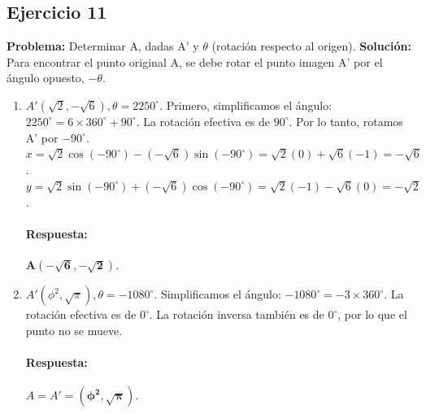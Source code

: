 \documentclass[12pt, letterpaper]{article}
\begin{document}
\subsection{Ejercicio 11}
\textbf{Problema:} Determinar A, dadas A' y $\theta$ (rotación respecto al origen).
\textbf{Solución:} Para encontrar el punto original A, se debe rotar el punto imagen A' por el ángulo opuesto, $-\theta$.
\begin{enumerate}[label=\alph*)]
    \item $A'(\sqrt{2},-\sqrt{6}), \theta=2250^\circ$. Primero, simplificamos el ángulo: $2250^\circ = 6 \times 360^\circ + 90^\circ$. La rotación efectiva es de $90^\circ$. Por lo tanto, rotamos A' por $-90^\circ$.
    $x = \sqrt{2}\cos(-90^\circ) - (-\sqrt{6})\sin(-90^\circ) = \sqrt{2}(0) + \sqrt{6}(-1) = -\sqrt{6}$.
    $y = \sqrt{2}\sin(-90^\circ) + (-\sqrt{6})\cos(-90^\circ) = \sqrt{2}(-1) - \sqrt{6}(0) = -\sqrt{2}$.
    \paragraph{Respuesta:} $\mathbf{A(-\sqrt{6}, -\sqrt{2})}$.
    
    \item $A'(\phi^2, \sqrt{\pi}), \theta=-1080^\circ$. Simplificamos el ángulo: $-1080^\circ = -3 \times 360^\circ$. La rotación efectiva es de $0^\circ$. La rotación inversa también es de $0^\circ$, por lo que el punto no se mueve.
    \paragraph{Respuesta:} $A=A'=\mathbf{(\phi^2, \sqrt{\pi})}$.
\end{enumerate}
\end{document}
